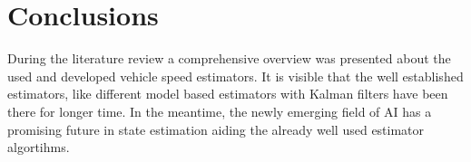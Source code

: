 \section{Conclusions}
During the literature review a comprehensive overview was presented about the used and developed vehicle speed estimators. It is visible that the well established estimators, like different model based estimators with Kalman filters have been there for longer time. In the meantime, the newly emerging field of AI has a promising future in state estimation aiding the already well used estimator algortihms. 